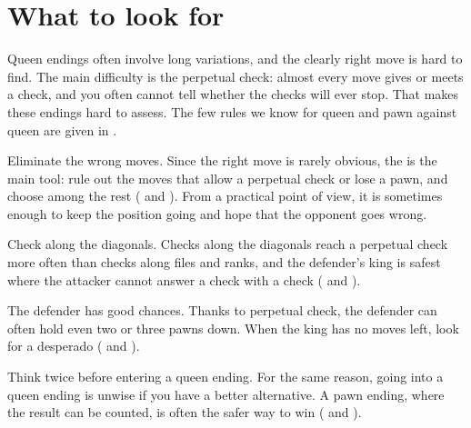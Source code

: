 \section*{What to look for}
Queen endings often involve long variations, and the clearly right move is hard to find. The main
difficulty is the perpetual check: almost every move gives or meets a check,
and you often cannot tell whether the checks will ever stop. That makes these endings hard to
assess. The few rules we know for queen and pawn against queen are given in
.

Eliminate the wrong moves. Since the right move is rarely obvious, the
 is the main tool: rule out
the moves that allow a perpetual check or lose a pawn, and choose among the rest
( and ). From a practical point of
view, it is sometimes enough to keep the position going and hope that the opponent goes wrong.

Check along the diagonals. Checks along the diagonals reach a perpetual check more often than
checks along files and ranks, and the defender's king is
safest where the attacker cannot answer a check with a check (
and ).

The defender has good chances. Thanks to perpetual check, the defender can often hold even
two or three pawns down. When the king has no moves left, look for a desperado
( and ).

Think twice before entering a queen ending. For the same reason, going into a queen ending is
unwise if you have a better alternative. A pawn ending, where the result can be counted, is often
the safer way to win ( and
).
